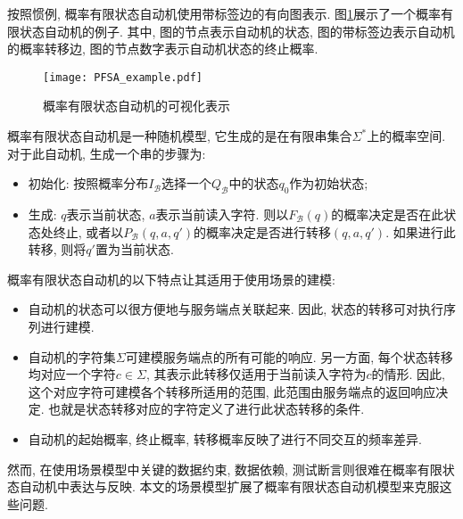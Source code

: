             按照惯例, 概率有限状态自动机使用带标签边的有向图表示. 图\ref{fig:PFSA_example}展示了一个概率有限状态自动机的例子. 其中, 图的节点表示自动机的状态, 图的带标签边表示自动机的概率转移边, 图的节点数字表示自动机状态的终止概率.
            
            \begin{figure}[!htb]
                \centering
                \texttt{[image: PFSA\_example.pdf]}
                \caption{概率有限状态自动机的可视化表示}
                \label{fig:PFSA_example}
            \end{figure}
            
            概率有限状态自动机是一种随机模型, 它生成的是在有限串集合$\Sigma^{*}$上的概率空间. 对于此自动机, 生成一个串的步骤为:
            
            \begin{itemize}
                \item 初始化: 按照概率分布$I_\mathcal{B}$选择一个$Q_{\mathcal{B}}$中的状态$q_0$作为初始状态;
                
                \item 生成: $q$表示当前状态, $a$表示当前读入字符. 则以$F_{\mathcal{B}}(q)$的概率决定是否在此状态处终止, 或者以$P_{\mathcal{B}}(q, a, q')$的概率决定是否进行转移$(q,a,q')$. 如果进行此转移, 则将$q'$置为当前状态.
            \end{itemize}
        
            概率有限状态自动机的以下特点让其适用于使用场景的建模:
            
            \begin{itemize}
                \item 自动机的状态可以很方便地与服务端点关联起来. 因此, 状态的转移可对执行序列进行建模.
                
                \item 自动机的字符集$\Sigma$可建模服务端点的所有可能的响应. 另一方面, 每个状态转移均对应一个字符$c \in \Sigma$, 其表示此转移仅适用于当前读入字符为$c$的情形. 因此, 这个对应字符可建模各个转移所适用的范围, 此范围由服务端点的返回响应决定. 也就是状态转移对应的字符定义了进行此状态转移的条件.
                
                \item 自动机的起始概率, 终止概率, 转移概率反映了进行不同交互的频率差异.
            \end{itemize}
            
            然而, 在使用场景模型中关键的数据约束, 数据依赖, 测试断言则很难在概率有限状态自动机中表达与反映. 本文的场景模型扩展了概率有限状态自动机模型来克服这些问题.
        
